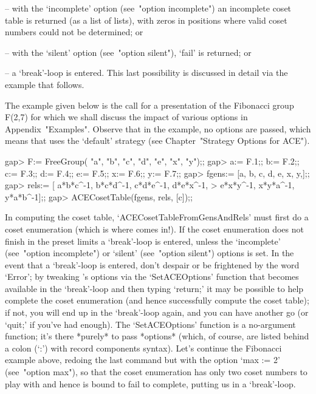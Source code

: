\beginlist

\item{--} with the `incomplete' option  (see~"option  incomplete")  an
incomplete coset table is returned (as a list of lists), with zeros in
positions where valid coset numbers could not be determined; or

\item{--} with the `silent' option (see~"option  silent"),  `fail'  is
returned; or

\item{--} a  `break'-loop  is  entered.  This  last   possibility   is
discussed in detail via the example that follows.

\endlist

The example given  below  is  the  call  for  a  presentation  of  the
Fibonacci group F(2,7) for  which  we  shall  discuss  the  impact  of
various options in Appendix~"Examples". Observe that in  the  example,
no options are passed, which means  that  {\ACE}  uses  the  `default'
strategy (see Chapter~"Strategy Options for ACE").

\beginexample
gap> F:= FreeGroup( "a", "b", "c", "d", "e", "x", "y");;
gap> a:= F.1;; b:= F.2;; c:= F.3;; d:= F.4;; e:= F.5;; x:= F.6;; y:= F.7;;
gap> fgens:= [a, b, c, d, e, x, y,];;
gap> rels:= [ a*b*c^-1, b*c*d^-1, c*d*e^-1, d*e*x^-1, 
>             e*x*y^-1, x*y*a^-1, y*a*b^-1];;
gap> ACECosetTable(fgens, rels, [c]);;
\endexample

In computing  the  coset  table,  `ACECosetTableFromGensAndRels'  must
first do a coset enumeration (which is where {\ACE} comes in!). If the
coset  enumeration  does  not  finish   in   the   preset   limits   a
`break'-loop{\undoquotes{}}        is
entered, unless the `incomplete' (see~"option incomplete") or `silent'
(see~"option silent") options is set. In the event that a `break'-loop
is entered, don't despair or be frightened by  the  word  `Error';  by
tweaking  {\ACE}'s  options  via  the  `SetACEOptions'  function  that
becomes available in the `break'-loop and then typing `return;' it may
be possible to help {\ACE} complete the coset enumeration  (and  hence
successfully compute the coset table); if not, you will end up in  the
`break'-loop again, and you can have another go (or `quit;' if  you've
had enough). The `SetACEOptions' function is a  no-argument  function;
it's there *purely* to pass *options* (which, of  course,  are  listed
behind a colon (`:') with record components  syntax).  Let's  continue
the Fibonacci example above, redoing the last  command  but  with  the
option `max := 2' (see~"option max"), so that  the  coset  enumeration
has only two coset numbers to play with and hence is bound to fail  to
complete, putting us in a `break'-loop.

